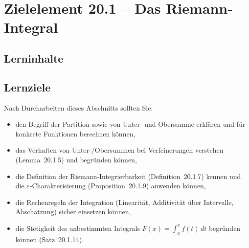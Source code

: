 \documentclass[a4paper,12pt]{article}
\begin{document}
\newpage

\section*{Zielelement 20.1 -- Das Riemann-Integral}

\subsection*{Lerninhalte}

\begin{center}
\end{center}

\subsection*{Lernziele}

Nach Durcharbeiten dieses Abschnitts sollten Sie:
\begin{itemize}
  \item den Begriff der Partition sowie von Unter- und Obersumme erklären und
        für konkrete Funktionen berechnen können,
  \item das Verhalten von Unter-/Obersummen bei Verfeinerungen verstehen
        (Lemma~20.1.5) und begründen können,
  \item die Definition der Riemann-Integrierbarkeit (Definition~20.1.7) kennen
        und die $\varepsilon$-Charakterisierung (Proposition~20.1.9) anwenden können,
  \item die Rechenregeln der Integration (Linearität, Additivität über Intervalle,
        Abschätzung) sicher einsetzen können,
  \item die Stetigkeit des unbestimmten Integrals $F(x) = \int_a^x f(t)\,dt$
        begründen können (Satz~20.1.14).
\end{itemize}
\end{document}
